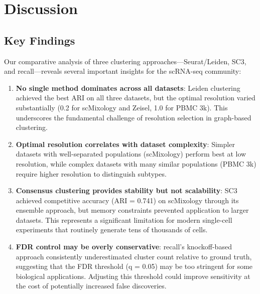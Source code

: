 
\section{Discussion}
\label{sec:discussion}

\subsection{Key Findings}

Our comparative analysis of three clustering approaches---Seurat/Leiden, SC3, and recall---reveals several important insights for the scRNA-seq community:

\begin{enumerate}
    \item \textbf{No single method dominates across all datasets}: Leiden clustering achieved the best ARI on all three datasets, but the optimal resolution varied substantially (0.2 for scMixology and Zeisel, 1.0 for PBMC 3k). This underscores the fundamental challenge of resolution selection in graph-based clustering.

    \item \textbf{Optimal resolution correlates with dataset complexity}: Simpler datasets with well-separated populations (scMixology) perform best at low resolution, while complex datasets with many similar populations (PBMC 3k) require higher resolution to distinguish subtypes.

    \item \textbf{Consensus clustering provides stability but not scalability}: SC3 achieved competitive accuracy (ARI = 0.741) on scMixology through its ensemble approach, but memory constraints prevented application to larger datasets. This represents a significant limitation for modern single-cell experiments that routinely generate tens of thousands of cells.

    \item \textbf{FDR control may be overly conservative}: recall's knockoff-based approach consistently underestimated cluster count relative to ground truth, suggesting that the FDR threshold (q = 0.05) may be too stringent for some biological applications. Adjusting this threshold could improve sensitivity at the cost of potentially increased false discoveries.
\end{enumerate}

